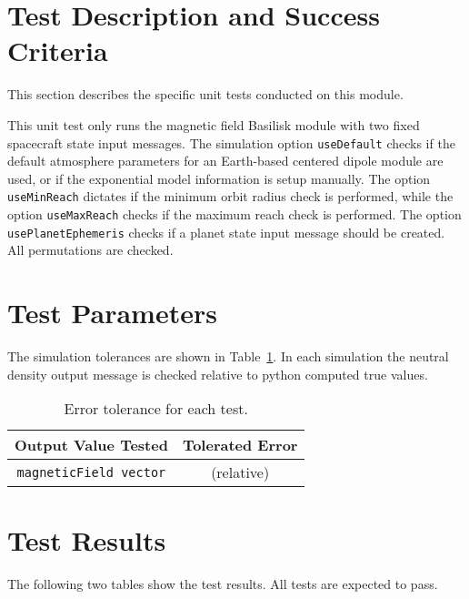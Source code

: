 
\section{Test Description and Success Criteria}
This section describes the specific unit tests conducted on this module.

This unit test only runs the magnetic field Basilisk module with two fixed spacecraft state input messages.  The simulation option {\tt useDefault} checks if the default atmosphere parameters for an Earth-based centered dipole module are used, or if the exponential model information is setup manually.  The option {\tt useMinReach} dictates if the minimum orbit radius check is performed, while the option {\tt useMaxReach} checks if the maximum reach check is performed.  The option {\tt usePlanetEphemeris} checks if a planet state input message should be created.  All permutations are checked.

\section{Test Parameters}
The simulation tolerances are shown in Table~\ref{tab:errortol}.  In each simulation the neutral density output message is checked relative to python computed true values.  
\begin{table}[htbp]
	\caption{Error tolerance for each test.}
	\label{tab:errortol}
	\centering \fontsize{10}{10}\selectfont
	\begin{tabular}{ c | c } %
		\hline\hline
		\textbf{Output Value Tested}  & \textbf{Tolerated Error}  \\ 
		\hline
		{\tt magneticField vector}        &  (relative) \\ 
		\hline\hline
	\end{tabular}
\end{table}




\section{Test Results}
The following two tables show the test results.  All tests are expected to pass.



